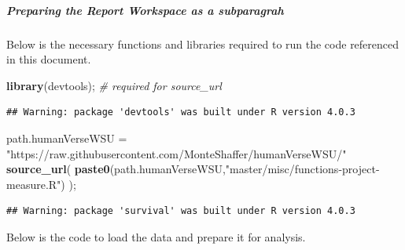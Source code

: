 \documentclass[]{article}
\newenvironment{Shaded}{\begin{snugshade}}{\end{snugshade}}
\newcommand{\CommentTok}[1]{\textcolor[rgb]{0.56,0.35,0.01}{\textit{#1}}}
\newcommand{\KeywordTok}[1]{\textcolor[rgb]{0.13,0.29,0.53}{\textbf{#1}}}
\newcommand{\NormalTok}[1]{#1}
\newcommand{\StringTok}[1]{\textcolor[rgb]{0.31,0.60,0.02}{#1}}
\begin{document}
\subparagraph{Preparing the Report Workspace as a subparagrah}
\label{sec:appendix-setup4}

Below is the necessary functions and libraries required to run the code
referenced in this document.

\begin{Shaded}
\begin{Highlighting}[]
\KeywordTok{library}\NormalTok{(devtools);       }\CommentTok{\# required for source\_url}
\end{Highlighting}
\end{Shaded}

\begin{verbatim}
## Warning: package 'devtools' was built under R version 4.0.3
\end{verbatim}

\begin{Shaded}
\begin{Highlighting}[]
\NormalTok{path.humanVerseWSU =}\StringTok{ "https://raw.githubusercontent.com/MonteShaffer/humanVerseWSU/"}
\KeywordTok{source\_url}\NormalTok{( }\KeywordTok{paste0}\NormalTok{(path.humanVerseWSU,}\StringTok{"master/misc/functions{-}project{-}measure.R"}\NormalTok{) );}
\end{Highlighting}
\end{Shaded}

\begin{verbatim}
## Warning: package 'survival' was built under R version 4.0.3
\end{verbatim}

Below is the code to load the data and prepare it for analysis.
\end{document}

